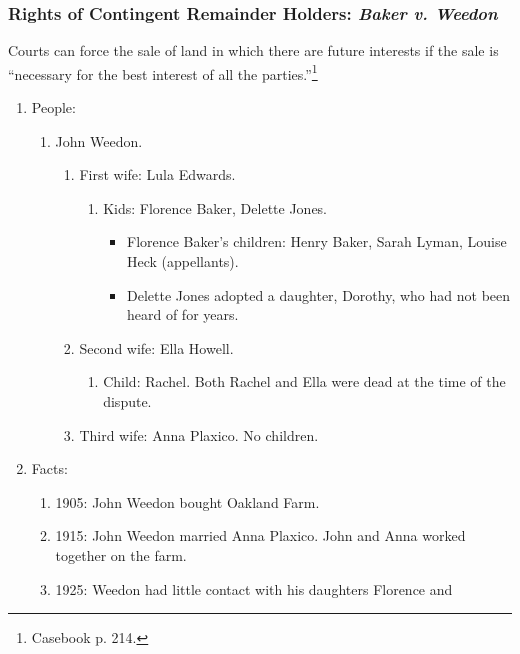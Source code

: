 \subsubsection{Rights of Contingent Remainder Holders: \emph{Baker v. Weedon}}

Courts can force the sale of land in which there are future interests if the 
sale is ``necessary for the best interest of all the 
parties.''\footnote{Casebook p. 214.}

\begin{enumerate}
    \item People:
    \begin{enumerate}
        \item John Weedon.
        \begin{enumerate}
            \item First wife: Lula Edwards.
            \begin{enumerate}
                \item Kids: Florence Baker, Delette Jones.
                \begin{itemize}
                    \item Florence Baker's children: Henry Baker, Sarah Lyman, 
                    Louise Heck (appellants).
                    \item Delette Jones adopted a daughter, Dorothy, who had 
                    not been heard of for years.
                \end{itemize}
            \end{enumerate}
            \item Second wife: Ella Howell.
            \begin{enumerate}
                \item Child: Rachel. Both Rachel and Ella were dead at the 
                time of the dispute.
            \end{enumerate}
            \item Third wife: Anna Plaxico. No children.
        \end{enumerate}
    \end{enumerate}
    \item Facts:
    \begin{enumerate}
        \item 1905: John Weedon bought Oakland Farm.
        \item 1915: John Weedon married Anna Plaxico. John and Anna worked 
        together on the farm.
        \item 1925: Weedon had little contact with his daughters Florence and 

\end{enumerate}
\end{enumerate}
